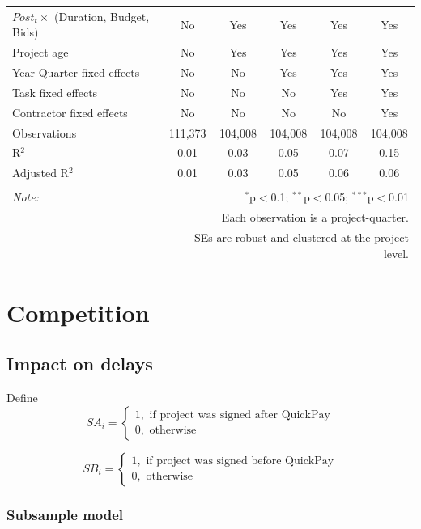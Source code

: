 \documentclass[
]{article}
\begin{document}
\begin{table}[H]
\begin{tabular}{@{\extracolsep{-2pt}}lccccc}
$Post_t \times $  (Duration, Budget, Bids) & No & Yes & Yes & Yes & Yes \\ 
Project age & No & Yes & Yes & Yes & Yes \\ 
Year-Quarter fixed effects & No & No & Yes & Yes & Yes \\ 
Task fixed effects & No & No & No & Yes & Yes \\ 
Contractor fixed effects & No & No & No & No & Yes \\ 
Observations & 111,373 & 104,008 & 104,008 & 104,008 & 104,008 \\ 
R$^{2}$ & 0.01 & 0.03 & 0.05 & 0.07 & 0.15 \\ 
Adjusted R$^{2}$ & 0.01 & 0.03 & 0.05 & 0.06 & 0.06 \\ 
\hline 
\hline \\[-1.8ex] 
\textit{Note:}  & \multicolumn{5}{r}{$^{*}$p$<$0.1; $^{**}$p$<$0.05; $^{***}$p$<$0.01} \\ 
 & \multicolumn{5}{r}{Each observation is a project-quarter.} \\ 
 & \multicolumn{5}{r}{SEs are robust and clustered at the project level.} \\ 
\end{tabular} 
\end{table}

\hypertarget{competition}{%
\section{Competition}\label{competition}}

\hypertarget{impact-on-delays}{%
\subsection{Impact on delays}\label{impact-on-delays}}

Define
\[ SA_i = \begin{cases} 1, \text{ if project was signed after QuickPay}\\
0, \text{ otherwise} \end{cases}\]

\[ SB_i = \begin{cases} 1, \text{ if project was signed before QuickPay}\\
0, \text{ otherwise} \end{cases}\]

\hypertarget{subsample-model}{%
\subsubsection{Subsample model}\label{subsample-model}}
\end{document}
